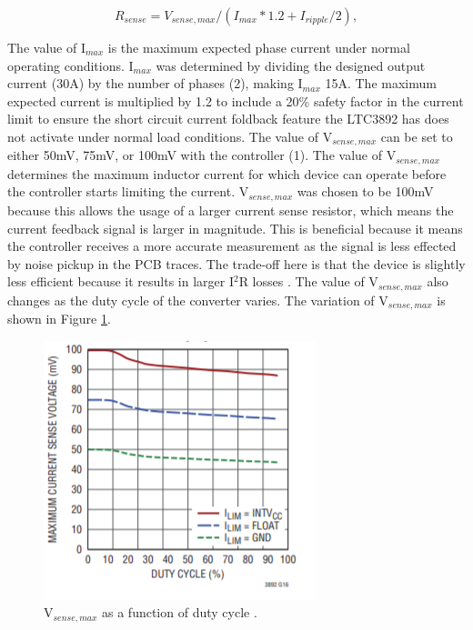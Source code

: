 \documentclass[11pt]{article}
\begin{document}
    \begin{equation}
        R_{sense}=V_{sense,max}/(I_{max}*1.2+I_{ripple}/2),
        \label{currentsense}
    \end{equation}

    \noindent The value of I$_{max}$ is the maximum expected phase current under normal operating conditions. I$_{max}$ was determined by dividing the designed output current (30A) by the number of phases (2), making I$_{max}$ 15A. The maximum expected current is multiplied by 1.2 to include a 20$\%$ safety factor in the current limit to ensure the short circuit current foldback feature the LTC3892 has does not activate under normal load conditions. 
    The value of V$_{sense,max}$ can be set to either 50mV, 75mV, or 100mV with the controller (1). The value of V$_{sense,max}$ determines the maximum inductor current for which device can operate before the controller starts limiting the current. V$_{sense,max}$ was chosen to be 100mV because this allows the usage of a larger current sense resistor, which means the current feedback signal is larger in magnitude. This is beneficial because it means the controller receives a more accurate measurement as the signal is less effected by noise pickup in the PCB traces. The trade-off here is that the device is slightly less efficient because it results in larger I$^2$R losses \cite{linear_technology_ltc3892:_nodate}.
    \newline
    \newline
    \noindent The value of V$_{sense,max}$ also changes as the duty cycle of the converter varies. The variation of V$_{sense,max}$ is shown in Figure \ref{sensemax}.
    
    \begin{figure}[H]
        \centering
        \includegraphics{vsense.PNG}
        \caption{V$_{sense,max}$ as a function of duty cycle
        \cite{linear_technology_ltc3892:_nodate}.}
        \label{sensemax}
    \end{figure}
    
\end{document}
